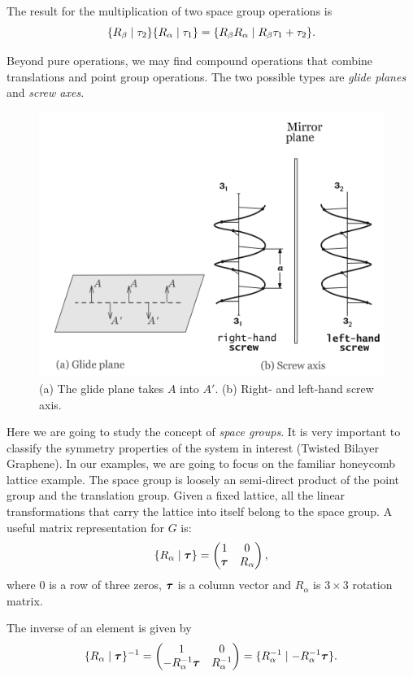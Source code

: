 The result for the multiplication of two space group operations is
$$
\{ R_\beta \mid \tau_2 \} \{ R_\alpha \mid \tau_1 \} = \{ R_\beta R_\alpha \mid R_\beta\tau_1 + \tau_2 \}.
$$

Beyond pure operations, we may find compound operations that combine translations and point group operations. The two possible types are \textit{glide planes} and \textit{screw axes}.
\begin{figure}[H]
\centering
\includegraphics[width=0.5\linewidth]{fig/glideplane-screwaxis.png}
\caption{(a) The glide plane takes $A$ into $A'$. (b) Right- and left-hand screw axis.}
\label{fig:glideplane-screwaxis}
\end{figure}

Here we are going to study the concept of \textit{space groups}. It is very important to classify the symmetry properties of the system in interest (Twisted Bilayer Graphene). In our examples, we are going to focus on the familiar honeycomb lattice example. The space group is loosely an semi-direct product of the point group and the translation group. Given a fixed lattice, all the linear transformations that carry the lattice into itself belong to the space group. A useful matrix representation for $G$ is:
\begin{equation} \label{eq:spacegroup-rep}
\{ R_\alpha \mid {\bm{\tau}} \} =
\begin{pmatrix}
1 & 0 \\
{\bm{\tau}} & R_\alpha
\end{pmatrix},
\end{equation}
where $0$ is a row of three zeros, ${\bm{\tau}}$ is a column vector and $R_\alpha$ is $3\times 3$ rotation matrix.

The inverse of an element is given by
\begin{equation} \label{eq:inv-spacegroup}
\{ R_\alpha \mid {\bm{\tau}} \}^{-1} =
\begin{pmatrix}
1 & 0 \\
-R_\alpha^{-1}{\bm{\tau}} & R_\alpha^{-1}
\end{pmatrix} =
\{ R_\alpha^{-1} \mid -R_\alpha^{-1}{\bm{\tau}} \}.
\end{equation}

